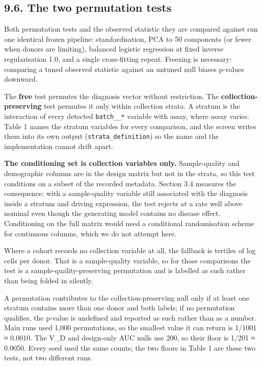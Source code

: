 \subsection{9.6. The two permutation tests}\label{the-two-permutation-tests}

Both permutation tests and the observed statistic they are compared against run one identical frozen pipeline: standardisation, PCA to 50 components (or fewer when donors are limiting), balanced logistic regression at fixed inverse regularisation 1.0, and a single cross-fitting repeat. Freezing is necessary: comparing a tuned observed statistic against an untuned null biases p-values downward.

The \textbf{free} test permutes the diagnosis vector without restriction. The \textbf{collection-preserving} test permutes it only within collection strata. A stratum is the interaction of every detected \texttt{batch\_\_*} variable with assay, where assay varies. Table 1 names the stratum variables for every comparison, and the screen writes them into its own output (\texttt{strata\_definition}) so the name and the implementation cannot drift apart.

\textbf{The conditioning set is collection variables only.} Sample-quality and demographic columns are in the design matrix but not in the strata, so this test conditions on a subset of the recorded metadata. Section 3.4 measures the consequence: with a sample-quality variable still associated with the diagnosis inside a stratum and driving expression, the test rejects at a rate well above nominal even though the generating model contains no disease effect. Conditioning on the full matrix would need a conditional randomisation scheme for continuous columns, which we do not attempt here.

Where a cohort records no collection variable at all, the fallback is tertiles of log cells per donor. That is a sample-quality variable, so for those comparisons the test is a sample-quality-preserving permutation and is labelled as such rather than being folded in silently.

A permutation contributes to the collection-preserving null only if at least one stratum contains more than one donor and both labels; if no permutation qualifies, the p-value is undefined and reported as such rather than as a number. Main runs used 1,000 permutations, so the smallest value it can return is 1/1001 ≈ 0.0010. The V\_D and design-only AUC nulls use 200, so their floor is 1/201 ≈ 0.0050. Every seed used the same counts; the two floors in Table 1 are these two tests, not two different runs.

